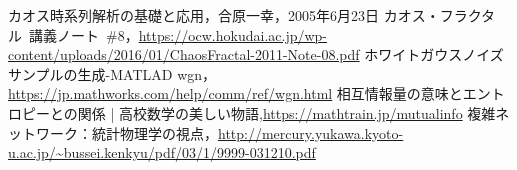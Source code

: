 \documentclass[autodetect-engine,dvipdfmx-if-dvi,ja=standard,a4paper,11pt]{bxjsarticle} %
\begin{document}
\begin{thebibliography}{9999}%
カオス時系列解析の基礎と応用，合原一幸，2005年6月23日
カオス・フラクタル\ 講義ノート\ \#8，\url{https://ocw.hokudai.ac.jp/wp-content/uploads/2016/01/ChaosFractal-2011-Note-08.pdf}
ホワイトガウスノイズサンプルの生成-MATLAD wgn，\url{https://jp.mathworks.com/help/comm/ref/wgn.html}
相互情報量の意味とエントロピーとの関係 | 高校数学の美しい物語,\url{https://mathtrain.jp/mutualinfo}
複雑ネットワーク：統計物理学の視点，\url{http://mercury.yukawa.kyoto-u.ac.jp/~bussei.kenkyu/pdf/03/1/9999-031210.pdf}
\end{thebibliography}

\end{document}

